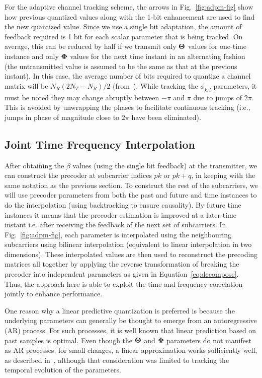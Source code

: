 \documentclass[journal,10pt,twocolumn]{IEEEtran}
\begin{document}
For the adaptive channel tracking scheme, the arrows in
Fig.~\ref{fig:adpm-fig} show how previous quantized values along with
the 1-bit enhancement are used to find the new quantized value. Since
we use a single bit adaptation, the amount of feedback required is 1
bit for each scalar parameter that is being tracked. On average, this
can be reduced by half if we transmit only $\bf{\Theta}$ values for
one-time instance and only $\bf{\Phi}$ values for the next time
instant in an alternating fashion (the untransmitted value is assumed
to be the same as that at the previous instant). In this case, the
average number of bits required to quantize a channel matrix will be
$N_{R}(2N_{T} - N_R )/2$ (from~\cite{4114278}). While tracking
the $\phi_{k,l}$ parameters, it must be noted they may change abruptly
between $-\pi$ and $\pi$ due to jumps of $2\pi$. This is avoided by
unwrapping the phases to facilitate continuous tracking (i.e., jumps
in phase of magnitude close to $2\pi$ have been eliminated).
\subsection{Joint Time Frequency Interpolation}
\label{interp}
After obtaining the $\beta$ values (using the single bit feedback) at
the transmitter, we can construct the precoder at subcarrier indices
$pk$ or $pk+q$, in keeping with the same notation as the previous
section. To construct the rest of the subcarriers, we will use
precoder parameters from both the past and future and time instances
to do the interpolation (using backtracking to ensure causality). 
By future time instances it means that the precoder estimation is 
improved at a later time instant i.e. after receiving the feedback of the next set of
subcarriers. In
Fig.~\ref{fig:adpm-fig}, each parameter is interpolated using the
neighbouring subcarriers using bilinear interpolation (equivalent to
linear interpolation in two dimensions). These interpolated values are
then used to reconstruct the precoding matrices all together by applying 
the reverse transformation of breaking the precoder into independent parameters as 
given in Equation~\ref{eq:decompose}. Thus,
the approach here is able to exploit the time and frequency
correlation jointly to enhance performance.

One reason why a linear predictive quantization is preferred is
because the underlying parameters can generally be thought to emerge
from an autoregressive (AR) process. For such processes, it is well
known that linear prediction based on past samples is optimal. Even
though the $\bf{\Theta}$ and $\bf{\Phi}$ parameters do not manifest as AR
processes, for small changes, a linear approximation works
sufficiently well, as described in~\cite{4114278}, although that
consideration was limited to tracking the temporal evolution of the
parameters.
\end{document}
